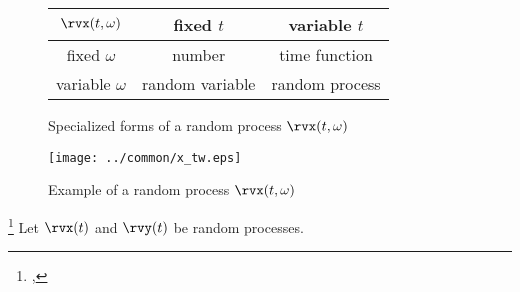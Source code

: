 \begin{figure}[ht]\color{figcolor}
\begin{center}
   \begin{tabular}{|c||c|c|}
      \hline
         $\rvx(t,\omega)$ &  fixed $t$      & variable $t$   \\
      \hline
      \hline
         fixed    $\omega$ & number          & time function  \\
      \hline
         variable $\omega$ & random variable & random process \\
      \hline
   \end{tabular}
\caption{
   Specialized forms of a random process $\rvx(t,\omega)$
   \label{fig:X(t,w)}
   }
\end{center}
\end{figure}

\begin{figure}[ht]\color{figcolor}
\begin{center}
\texttt{[image: ../common/x\_tw.eps]}
\end{center}
\caption{
  Example of a random process $\rvx(t,\omega)$
  \label{fig:X(t,w)graph}
}
\end{figure}

\begin{definition}
\footnote{
  ,
  }
\label{def:Rxx}
\label{def:Rxy}
Let $\rvx(t)$ and $\rvy(t)$ be random processes.\\
\end{definition}

